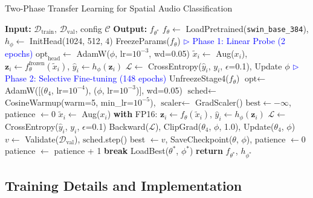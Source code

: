 \documentclass[11pt,a4paper]{article}
\begin{document}
\begin{algorithm}[H]
\caption{Two-Phase Transfer Learning for Spatial Audio Classification}
\label{alg:training}
\small
\begin{algorithmic}[1]
\State \textbf{Input:} $\mathcal{D}_{\text{train}}$, $\mathcal{D}_{\text{val}}$, config $\mathcal{C}$ \quad \textbf{Output:} $f_{\theta^*}$
\State $f_{\theta} \gets$ LoadPretrained(\texttt{swin\_base\_384}), $h_{\phi} \gets$ InitHead(1024, 512, 4)
\State FreezeParams($f_{\theta}$)
\State \textcolor{blue}{$\triangleright$ Phase 1: Linear Probe (2 epochs)}
\State $\text{opt}_{\text{head}} \gets$ AdamW($\phi$, lr=$10^{-3}$, wd=0.05)
        \State $\tilde{x}_i \gets$ Aug($x_i$), $\mathbf{z}_i \gets f_{\theta}^{\text{frozen}}(\tilde{x}_i)$, $\hat{y}_i \gets h_{\phi}(\mathbf{z}_i)$
        \State $\mathcal{L} \gets$ CrossEntropy($\hat{y}_i$, $y_i$, $\epsilon$=0.1), Update $\phi$
    \EndFor
\EndFor
\State \textcolor{blue}{$\triangleright$ Phase 2: Selective Fine-tuning (148 epochs)}
\State UnfreezeStage4($f_{\theta}$)
\State $\text{opt} \gets$ AdamW([($\theta_4$, lr=$10^{-4}$), ($\phi$, lr=$10^{-3}$)], wd=0.05)
\State $\text{sched} \gets$ CosineWarmup(warm=5, min\_lr=$10^{-5}$), $\text{scaler} \gets$ GradScaler()
\State $\text{best} \gets -\infty$, patience $\gets 0$
        \State $\tilde{x}_i \gets$ Aug($x_i$)
        \State \textbf{with} FP16: $\mathbf{z}_i \gets f_{\theta}(\tilde{x}_i)$, $\hat{y}_i \gets h_{\phi}(\mathbf{z}_i)$
        \State $\mathcal{L} \gets$ CrossEntropy($\hat{y}_i$, $y_i$, $\epsilon$=0.1)
        \State Backward($\mathcal{L}$), ClipGrad($\theta_4$, $\phi$, 1.0), Update($\theta_4$, $\phi$)
    \EndFor
    \State $v \gets$ Validate($\mathcal{D}_{\text{val}}$), $\text{sched}$.step()
        \State best $\gets v$, SaveCheckpoint($\theta$, $\phi$), patience $\gets 0$
    \Else
        \State patience $\gets$ patience + 1
         \textbf{break} \EndIf
    \EndIf
\EndFor
\State LoadBest($\theta^*$, $\phi^*$) \quad \textbf{return} $f_{\theta^*}$, $h_{\phi^*}$
\end{algorithmic}
\end{algorithm}

\subsection{Training Details and Implementation}
\end{document}

